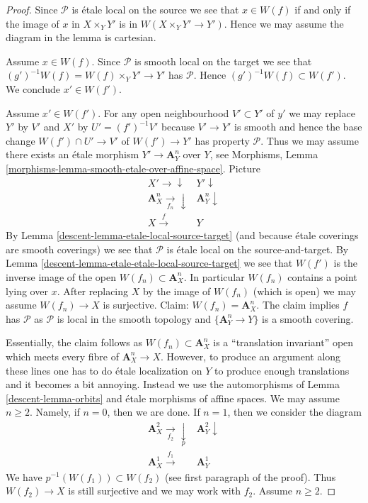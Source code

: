 \begin{proof}

Since $\mathcal{P}$ is \'etale local on the source we see
that $x \in W(f)$ if and only if the image of $x$ in
$X \times_Y Y'$ is in $W(X \times_Y Y' \to Y')$. Hence we
may assume the diagram in the lemma is cartesian.

\medskip\noindent
Assume $x \in W(f)$. Since $\mathcal{P}$ is smooth local on the target
we see that $(g')^{-1}W(f) = W(f) \times_Y Y' \to Y'$ has $\mathcal{P}$.
Hence $(g')^{-1}W(f) \subset W(f')$. We conclude $x' \in W(f')$.

\medskip\noindent
Assume $x' \in W(f')$.
For any open neighbourhood $V' \subset Y'$ of $y'$ we may replace
$Y'$ by $V'$ and $X'$ by $U' = (f')^{-1}V'$ because $V' \to Y'$ is smooth
and hence the base change $W(f') \cap U' \to V'$ of $W(f') \to Y'$
has property $\mathcal{P}$. Thus we may assume there exists
an \'etale morphism $Y' \to \mathbf{A}^n_Y$ over $Y$, see
Morphisms, Lemma \ref{morphisms-lemma-smooth-etale-over-affine-space}.
Picture
$$
\begin{array}{cc}X' \longrightarrow\downarrow & Y' \downarrow \\ \mathbf{A}^n_X \underset{f_n}{\longrightarrow}\downarrow & \mathbf{A}^n_Y \downarrow \\ X \overset{f}{\longrightarrow} & Y\end{array}
$$
By Lemma \ref{descent-lemma-etale-local-source-target}
(and because \'etale coverings are smooth coverings)
we see that $\mathcal{P}$ is \'etale local on the source-and-target.
By Lemma \ref{descent-lemma-etale-etale-local-source-target}
we see that $W(f')$ is the inverse image of
the open $W(f_n) \subset \mathbf{A}^n_X$. In particular
$W(f_n)$ contains a point lying over $x$.
After replacing $X$ by the image of $W(f_n)$ (which is open)
we may assume $W(f_n) \to X$ is surjective.
Claim: $W(f_n) = \mathbf{A}^n_X$.
The claim implies $f$ has $\mathcal{P}$ as
$\mathcal{P}$ is local in the smooth topology
and $\{\mathbf{A}^n_Y \to Y\}$ is a smooth covering.

\medskip\noindent
Essentially, the claim follows as $W(f_n) \subset \mathbf{A}^n_X$ is a
``translation invariant'' open which meets every fibre of
$\mathbf{A}^n_X \to X$. However, to produce an argument along these lines
one has to do \'etale localization on $Y$ to produce enough translations
and it becomes a bit annoying. Instead we use the automorphisms
of Lemma \ref{descent-lemma-orbits} and \'etale morphisms of affine spaces.
We may assume $n \geq 2$. Namely, if $n = 0$, then we are done.
If $n = 1$, then we consider the diagram
$$
\begin{array}{cc}\mathbf{A}^2_X \underset{f_2}{\longrightarrow}\underset{p}{\downarrow} & \mathbf{A}^2_Y \downarrow \\ \mathbf{A}^1_X \overset{f_1}{\longrightarrow} & \mathbf{A}^1_Y\end{array}
$$
We have $p^{-1}(W(f_1)) \subset W(f_2)$ (see first paragraph
of the proof). Thus $W(f_2) \to X$ is still surjective
and we may work with $f_2$. Assume $n \geq 2$.


\end{proof}
